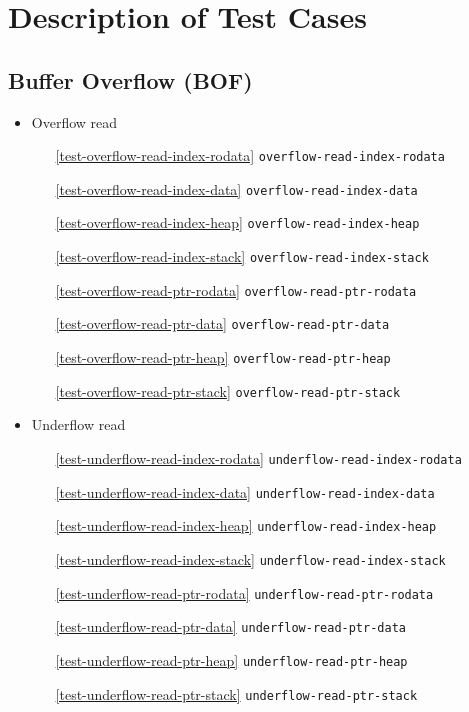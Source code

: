 \documentclass[a4paper]{book}
\begin{document}
\chapter{Description of Test Cases}

\section{Buffer Overflow (BOF)}
\begin{itemize}[noitemsep]

\item Overflow read
 \begin{itemize}[noitemsep, nolistsep, leftmargin=1em]
    \item[\ref{test-overflow-read-index-rodata}]      \texttt{overflow-read-index-rodata}
    \item[\ref{test-overflow-read-index-data}]        \texttt{overflow-read-index-data}
    \item[\ref{test-overflow-read-index-heap}]        \texttt{overflow-read-index-heap}
    \item[\ref{test-overflow-read-index-stack}]       \texttt{overflow-read-index-stack}
    \item[\ref{test-overflow-read-ptr-rodata}]        \texttt{overflow-read-ptr-rodata}
    \item[\ref{test-overflow-read-ptr-data}]          \texttt{overflow-read-ptr-data}
    \item[\ref{test-overflow-read-ptr-heap}]          \texttt{overflow-read-ptr-heap}
    \item[\ref{test-overflow-read-ptr-stack}]         \texttt{overflow-read-ptr-stack}
 \end{itemize}

\item Underflow read
 \begin{itemize}[noitemsep, nolistsep, leftmargin=1em]
    \item[\ref{test-underflow-read-index-rodata}]     \texttt{underflow-read-index-rodata}
    \item[\ref{test-underflow-read-index-data}]       \texttt{underflow-read-index-data}
    \item[\ref{test-underflow-read-index-heap}]       \texttt{underflow-read-index-heap}
    \item[\ref{test-underflow-read-index-stack}]      \texttt{underflow-read-index-stack}
    \item[\ref{test-underflow-read-ptr-rodata}]       \texttt{underflow-read-ptr-rodata}
    \item[\ref{test-underflow-read-ptr-data}]         \texttt{underflow-read-ptr-data}
    \item[\ref{test-underflow-read-ptr-heap}]         \texttt{underflow-read-ptr-heap}
    \item[\ref{test-underflow-read-ptr-stack}]        \texttt{underflow-read-ptr-stack}
 \end{itemize}


\end{itemize}
\end{document}
